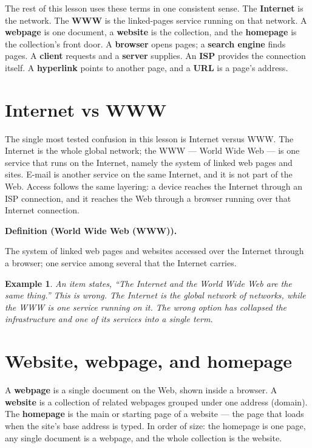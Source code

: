 \documentclass[11pt]{article}
\newtheorem{example}{Example}[section]
\newenvironment{definitionbox}[1]{%
  \par\noindent\textbf{Definition (#1).}\ \itshape
}{\par\vspace{0.3em}}
\begin{document}
The rest of this lesson uses these terms in one consistent sense. The
\textbf{Internet} is the network. The \textbf{WWW} is the linked-pages
service running on that network. A \textbf{webpage} is one document, a
\textbf{website} is the collection, and the \textbf{homepage} is the
collection's front door. A \textbf{browser} opens pages; a \textbf{search
engine} finds pages. A \textbf{client} requests and a \textbf{server}
supplies. An \textbf{ISP} provides the connection itself. A
\textbf{hyperlink} points to another page, and a \textbf{URL} is a page's
address.

\section{Internet vs WWW}
The single most tested confusion in this lesson is Internet versus WWW. The
Internet is the whole global network; the WWW --- World Wide Web --- is one
service that runs on the Internet, namely the system of linked web pages and
sites. E-mail is another service on the same Internet, and it is not part of
the Web. Access follows the same layering: a device reaches the Internet
through an ISP connection, and it reaches the Web through a browser running
over that Internet connection.

\begin{definitionbox}{World Wide Web (WWW)}
The system of linked web pages and websites accessed over the Internet
through a browser; one service among several that the Internet carries.
\end{definitionbox}

\begin{example}
An item states, ``The Internet and the World Wide Web are the same thing.''
This is wrong. The Internet is the global network of networks, while the WWW
is one service running on it. The wrong option has collapsed the
infrastructure and one of its services into a single term.
\end{example}

\section{Website, webpage, and homepage}
A \textbf{webpage} is a single document on the Web, shown inside a browser.
A \textbf{website} is a collection of related webpages grouped under one
address (domain). The \textbf{homepage} is the main or starting page of a
website --- the page that loads when the site's base address is typed. In
order of size: the homepage is one page, any single document is a webpage,
and the whole collection is the website.
\end{document}
